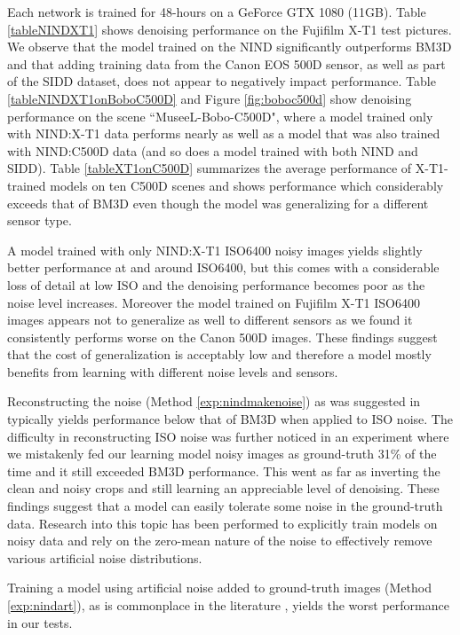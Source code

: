 Each network is trained for 48-hours on a GeForce GTX 1080 (11GB). %
Table \ref{tableNINDXT1} shows denoising performance on the Fujifilm X-T1 test pictures. We observe that the model trained on the \ac{NIND} significantly outperforms \ac{BM3D} and that adding training data from the Canon EOS 500D sensor, as well as part of the \ac{SIDD} dataset, does not appear to negatively impact performance. Table \ref{tableNINDXT1onBoboC500D} and Figure \ref{fig:boboc500d} show denoising performance on the scene ``MuseeL-Bobo-C500D", where a model trained only with \ac{NIND}:\ac{X-T1} data performs nearly as well as a model that was also trained with \ac{NIND}:\ac{C500D} data (and so does a model trained with both \ac{NIND} and \ac{SIDD}). Table \ref{tableXT1onC500D} summarizes the average performance of \ac{X-T1}-trained models on ten \ac{C500D} scenes and shows performance which considerably exceeds that of \ac{BM3D} even though the model was generalizing for a different sensor type.

A model trained with only \ac{NIND}:\ac{X-T1} ISO6400 noisy images yields slightly better performance at and around ISO6400, but this comes with a considerable loss of detail at low ISO and the denoising performance becomes poor as the noise level increases. Moreover the model trained on Fujifilm X-T1 ISO6400 images appears not to generalize as well to different sensors as we found it consistently performs worse on the Canon 500D images. These findings suggest that the cost of generalization is acceptably low and therefore a model mostly benefits from learning with different noise levels and sensors.

Reconstructing the noise (Method \ref{exp:nindmakenoise}) as was suggested in \cite{dncnn} typically yields performance below that of BM3D when applied to ISO noise. The difficulty in reconstructing ISO noise was further noticed in an experiment where we mistakenly fed our learning model noisy images as ground-truth 31\% of the time and it still exceeded BM3D performance. This went as far as inverting the clean and noisy crops and still learning an appreciable level of denoising. These findings suggest that a model can easily tolerate some noise in the ground-truth data. Research into this topic \cite{noise2noise}  has been performed to explicitly train models on noisy data and rely on the zero-mean nature of the noise to effectively remove various artificial noise distributions.

Training a model using artificial noise added to ground-truth images (Method \ref{exp:nindart}), as is commonplace in the literature \cite{rednet}\cite{dncnn}, yields the worst performance in our tests.

